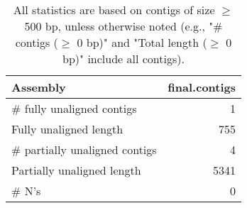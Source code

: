 \documentclass[12pt,a4paper]{article}
\begin{document}
\begin{table}[ht]
\begin{center}
\caption{All statistics are based on contigs of size $\geq$ 500 bp, unless otherwise noted (e.g., "\# contigs ($\geq$ 0 bp)" and "Total length ($\geq$ 0 bp)" include all contigs).}
\begin{tabular}{|l*{1}{|r}|}
\hline
Assembly & final.contigs \\ \hline
\# fully unaligned contigs & 1 \\ \hline
Fully unaligned length & 755 \\ \hline
\# partially unaligned contigs & 4 \\ \hline
Partially unaligned length & 5341 \\ \hline
\# N's & 0 \\ \hline
\end{tabular}
\end{center}
\end{table}
\end{document}
